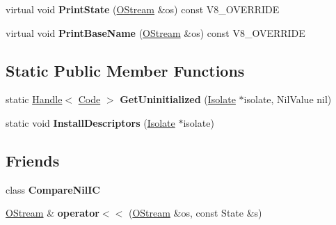 \begin{DoxyCompactItemize}
\item 
\hypertarget{classv8_1_1internal_1_1_compare_nil_i_c_stub_ae59e9c89dc1b5711054d5765a535a564}{}virtual void {\bfseries Print\+State} (\hyperlink{classv8_1_1internal_1_1_o_stream}{O\+Stream} \&os) const V8\+\_\+\+O\+V\+E\+R\+R\+I\+D\+E\label{classv8_1_1internal_1_1_compare_nil_i_c_stub_ae59e9c89dc1b5711054d5765a535a564}

\item 
\hypertarget{classv8_1_1internal_1_1_compare_nil_i_c_stub_a5c1877eb47a477f98056172202da551d}{}virtual void {\bfseries Print\+Base\+Name} (\hyperlink{classv8_1_1internal_1_1_o_stream}{O\+Stream} \&os) const V8\+\_\+\+O\+V\+E\+R\+R\+I\+D\+E\label{classv8_1_1internal_1_1_compare_nil_i_c_stub_a5c1877eb47a477f98056172202da551d}

\end{DoxyCompactItemize}
\subsection*{Static Public Member Functions}
\begin{DoxyCompactItemize}
\item 
\hypertarget{classv8_1_1internal_1_1_compare_nil_i_c_stub_a6b3a66e9697615c496cb9129de19c9d8}{}static \hyperlink{classv8_1_1internal_1_1_handle}{Handle}$<$ \hyperlink{classv8_1_1internal_1_1_code}{Code} $>$ {\bfseries Get\+Uninitialized} (\hyperlink{classv8_1_1internal_1_1_isolate}{Isolate} $\ast$isolate, Nil\+Value nil)\label{classv8_1_1internal_1_1_compare_nil_i_c_stub_a6b3a66e9697615c496cb9129de19c9d8}

\item 
\hypertarget{classv8_1_1internal_1_1_compare_nil_i_c_stub_a360bbff9f51975e91eddea9a915ed936}{}static void {\bfseries Install\+Descriptors} (\hyperlink{classv8_1_1internal_1_1_isolate}{Isolate} $\ast$isolate)\label{classv8_1_1internal_1_1_compare_nil_i_c_stub_a360bbff9f51975e91eddea9a915ed936}

\end{DoxyCompactItemize}
\subsection*{Friends}
\begin{DoxyCompactItemize}
\item 
\hypertarget{classv8_1_1internal_1_1_compare_nil_i_c_stub_aa2877cde80980679dac64ddfa462149f}{}class {\bfseries Compare\+Nil\+I\+C}\label{classv8_1_1internal_1_1_compare_nil_i_c_stub_aa2877cde80980679dac64ddfa462149f}

\item 
\hypertarget{classv8_1_1internal_1_1_compare_nil_i_c_stub_a1948acbc8828e8acfacff13f2505e8b0}{}\hyperlink{classv8_1_1internal_1_1_o_stream}{O\+Stream} \& {\bfseries operator$<$$<$} (\hyperlink{classv8_1_1internal_1_1_o_stream}{O\+Stream} \&os, const State \&s)\label{classv8_1_1internal_1_1_compare_nil_i_c_stub_a1948acbc8828e8acfacff13f2505e8b0}

\end{DoxyCompactItemize}
